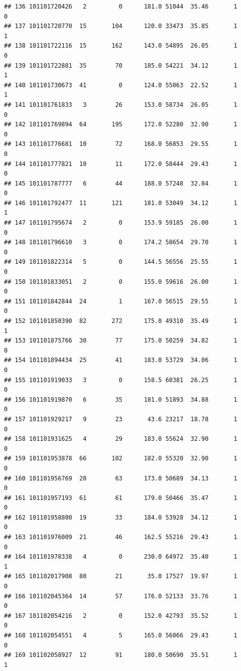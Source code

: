 \documentclass[
]{article}
\begin{document}
\begin{verbatim}
## 136 101101720426   2         0      181.0 51044  35.46       1          0
## 137 101101720770  15       104      120.0 33473  35.85       1          1
## 138 101101722116  15       162      143.0 54895  26.05       1          0
## 139 101101722881  35        70      185.0 54221  34.12       1          1
## 140 101101730673  41         0      124.0 55063  22.52       1          1
## 141 101101761833   3        26      153.0 58734  26.05       1          0
## 142 101101769894  64       195      172.0 52280  32.90       1          0
## 143 101101776681  10        72      168.0 56853  29.55       1          0
## 144 101101777821  10        11      172.0 58444  29.43       1          0
## 145 101101787777   6        44      188.0 57248  32.84       1          0
## 146 101101792477  11       121      181.0 53049  34.12       1          1
## 147 101101795674   2         0      153.9 59185  26.00       1          0
## 148 101101796610   3         0      174.2 58654  29.70       1          0
## 149 101101822314   5         0      144.5 56556  25.55       1          0
## 150 101101833051   2         0      155.0 59616  26.00       1          0
## 151 101101842844  24         1      167.0 56515  29.55       1          0
## 152 101101850390  82       272      175.0 49310  35.49       1          1
## 153 101101875766  30        77      175.0 50259  34.82       1          0
## 154 101101894434  25        41      183.0 53729  34.06       1          0
## 155 101101919033   3         0      158.5 60381  26.25       1          0
## 156 101101919870   6        35      181.0 51893  34.88       1          0
## 157 101101929217   9        23       43.6 23217  18.78       1          0
## 158 101101931625   4        29      183.0 55624  32.90       1          0
## 159 101101953878  66       102      182.0 55320  32.90       1          0
## 160 101101956769  20        63      173.0 50689  34.13       1          0
## 161 101101957193  61        61      179.0 50466  35.47       1          0
## 162 101101958800  19        33      184.0 53928  34.12       1          0
## 163 101101976009  21        46      162.5 55216  29.43       1          0
## 164 101101978338   4         0      230.0 64972  35.40       1          1
## 165 101102017908  80        21       35.0 17527  19.97       1          0
## 166 101102045364  14        57      176.0 52133  33.76       1          0
## 167 101102054216   2         0      152.0 42793  35.52       1          0
## 168 101102054551   4         5      165.0 56066  29.43       1          0
## 169 101102058927  12        91      180.0 50690  35.51       1          1

\end{verbatim}
\end{document}
